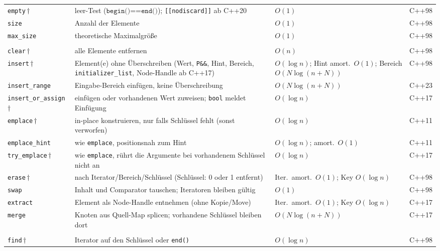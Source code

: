 \begin{longtable}{@{}>{\raggedright\arraybackslash}p{3.1cm} >{\raggedright\arraybackslash}p{5.7cm} >{\raggedright\arraybackslash}p{2.7cm} >{\raggedright\arraybackslash}p{1.1cm}@{}}
  \addlinespace[2pt]
  \texttt{empty}\,$\dagger$ & leer-Test ($\texttt{begin()==end()}$); \texttt{[[nodiscard]]} ab C++20 & $O(1)$ & C++98 \\
  \texttt{size} & Anzahl der Elemente & $O(1)$ & C++98 \\
  \texttt{max\_size} & theoretische Maximalgröße & $O(1)$ & C++98 \\
  \addlinespace[3pt]
  \multicolumn{4}{@{}l}{\textbf{Modifikatoren}}\\
  \addlinespace[2pt]
  \texttt{clear}\,$\dagger$ & alle Elemente entfernen & $O(n)$ & C++98 \\
  \texttt{insert}\,$\dagger$ & Element(e) ohne Überschreiben (Wert, \texttt{P\&\&}, Hint, Bereich, \texttt{initializer\_list}, Node-Handle ab C++17) & $O(\log n)$; Hint amort.\ $O(1)$; Bereich $O(N\log(n{+}N))$ & C++98 \\
  \texttt{insert\_range} & Eingabe-Bereich einfügen, keine Überschreibung & $O(N\log(n{+}N))$ & C++23 \\
  \texttt{insert\_\allowbreak{}or\_\allowbreak{}assign}\,$\dagger$ & einfügen oder vorhandenen Wert zuweisen; \texttt{bool} meldet Einfügung & $O(\log n)$ & C++17 \\
  \texttt{emplace}\,$\dagger$ & in-place konstruieren, nur falls Schlüssel fehlt (sonst verworfen) & $O(\log n)$ & C++11 \\
  \texttt{emplace\_hint} & wie \texttt{emplace}, positionsnah zum Hint & $O(\log n)$; amort.\ $O(1)$ & C++11 \\
  \texttt{try\_emplace}\,$\dagger$ & wie \texttt{emplace}, rührt die Argumente bei vorhandenem Schlüssel nicht an & $O(\log n)$ & C++17 \\
  \texttt{erase}\,$\dagger$ & nach Iterator/Bereich/Schlüssel (Schlüssel: 0 oder 1 entfernt) & Iter.\ amort.\ $O(1)$; Key $O(\log n)$ & C++98 \\
  \texttt{swap} & Inhalt und Comparator tauschen; Iteratoren bleiben gültig & $O(1)$ & C++98 \\
  \texttt{extract} & Element als Node-Handle entnehmen (ohne Kopie/Move) & Iter.\ amort.\ $O(1)$; Key $O(\log n)$ & C++17 \\
  \texttt{merge} & Knoten aus Quell-Map splicen; vorhandene Schlüssel bleiben dort & $O(N\log(n{+}N))$ & C++17 \\
  \addlinespace[3pt]
  \multicolumn{4}{@{}l}{\textbf{Suche}}\\
  \addlinespace[2pt]
  \texttt{find}\,$\dagger$ & Iterator auf den Schlüssel oder \texttt{end()} & $O(\log n)$ & C++98 \\

\end{longtable}
